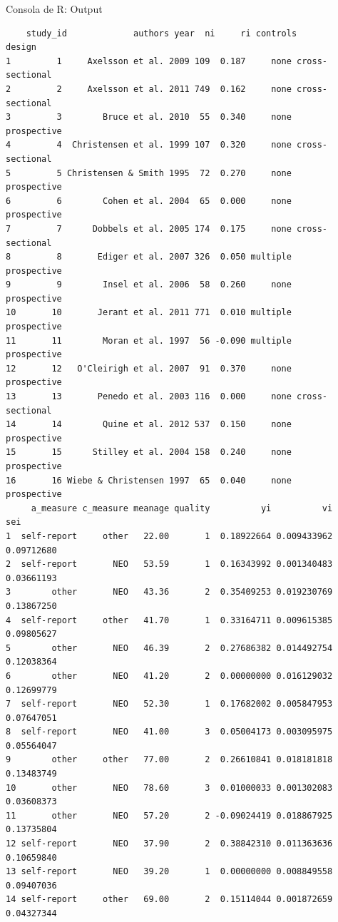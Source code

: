 \documentclass[
  bookmarksnumbered]{article}
\begin{document}
\begin{ROut}{Consola de R: Output~\thetcbcounter}
                \begin{footnotesize}
                \begin{verbatim}    study_id             authors year  ni     ri controls          design
1         1     Axelsson et al. 2009 109  0.187     none cross-sectional
2         2     Axelsson et al. 2011 749  0.162     none cross-sectional
3         3        Bruce et al. 2010  55  0.340     none     prospective
4         4  Christensen et al. 1999 107  0.320     none cross-sectional
5         5 Christensen & Smith 1995  72  0.270     none     prospective
6         6        Cohen et al. 2004  65  0.000     none     prospective
7         7      Dobbels et al. 2005 174  0.175     none cross-sectional
8         8       Ediger et al. 2007 326  0.050 multiple     prospective
9         9        Insel et al. 2006  58  0.260     none     prospective
10       10       Jerant et al. 2011 771  0.010 multiple     prospective
11       11        Moran et al. 1997  56 -0.090 multiple     prospective
12       12   O'Cleirigh et al. 2007  91  0.370     none     prospective
13       13       Penedo et al. 2003 116  0.000     none cross-sectional
14       14        Quine et al. 2012 537  0.150     none     prospective
15       15      Stilley et al. 2004 158  0.240     none     prospective
16       16 Wiebe & Christensen 1997  65  0.040     none     prospective
     a_measure c_measure meanage quality          yi          vi        sei
1  self-report     other   22.00       1  0.18922664 0.009433962 0.09712680
2  self-report       NEO   53.59       1  0.16343992 0.001340483 0.03661193
3        other       NEO   43.36       2  0.35409253 0.019230769 0.13867250
4  self-report     other   41.70       1  0.33164711 0.009615385 0.09805627
5        other       NEO   46.39       2  0.27686382 0.014492754 0.12038364
6        other       NEO   41.20       2  0.00000000 0.016129032 0.12699779
7  self-report       NEO   52.30       1  0.17682002 0.005847953 0.07647051
8  self-report       NEO   41.00       3  0.05004173 0.003095975 0.05564047
9        other     other   77.00       2  0.26610841 0.018181818 0.13483749
10       other       NEO   78.60       3  0.01000033 0.001302083 0.03608373
11       other       NEO   57.20       2 -0.09024419 0.018867925 0.13735804
12 self-report       NEO   37.90       2  0.38842310 0.011363636 0.10659840
13 self-report       NEO   39.20       1  0.00000000 0.008849558 0.09407036
14 self-report     other   69.00       2  0.15114044 0.001872659 0.04327344

\end{verbatim}
\end{footnotesize}
\end{ROut}
\end{document}
